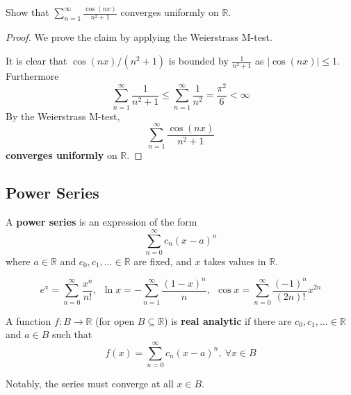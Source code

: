 \newpage 
\begin{prob}
    Show that $\sum_{n=1}^{\infty}\frac{\cos(nx)}{n^2 + 1}$ converges
    uniformly on $\mathbb R$.
\end{prob}
\begin{proof}
    We prove the claim by applying the Weierstrass M-test. 

    It is clear that $\cos(nx)/(n^2+1)$ is bounded by 
    $\frac{1}{n^2 + 1}$ as $|\cos(nx)| \leq 1$. 
    Furthermore 
    \[
        \displaystyle\sum_{n=1}^{\infty}\frac{1}{n^2 + 1} \leq
        \displaystyle\sum_{n=1}^{\infty}\frac{1}{n^2} = 
        \frac{\pi^2}{6} < \infty
    \]
    By the Weierstrass M-test,  
    \[
        \displaystyle\sum_{n=1}^{\infty}\frac{\cos(nx)}{n^2 + 1}
    \]
    \textbf{converges uniformly} on $\mathbb R$.
\end{proof}

\newpage 
\subsection{Power Series}
\begin{defn}
    A \textbf{power series} is an expression of the form 
    \[
        \displaystyle\sum_{n=0}^{\infty}c_n(x-a)^n
    \]
    where $a \in \mathbb R$ and $c_0,c_1,\ldots \in \mathbb R$ are 
    fixed, and $x$ takes values in $\mathbb R$. 
\end{defn}
\begin{ex}
    \[
        e^x = \displaystyle\sum_{n=0}^{\infty}\frac{x^n}{n!}, \ \ 
        \ln x = -\displaystyle\sum_{n=1}^{\infty} \frac{(1-x)^n}{n}, 
        \ \ 
        \cos x = 
        \displaystyle\sum_{n=0}^{\infty} \frac{(-1)^n}{(2n)!}x^{2n}
    \]
\end{ex}
\begin{defn}
    A function $f : B \to \mathbb R$ (for open $B \subseteq 
    \mathbb R$) is \textbf{real analytic} if there are 
    $c_0,c_1,\ldots \in \mathbb R$ and $a \in B$ such that 
    \[
        f(x) = \displaystyle\sum_{n=0}^{\infty}c_n(x-a)^n, \ \forall 
        x \in B
    \]
\end{defn}
Notably, the series must converge at all $x \in B$. 

